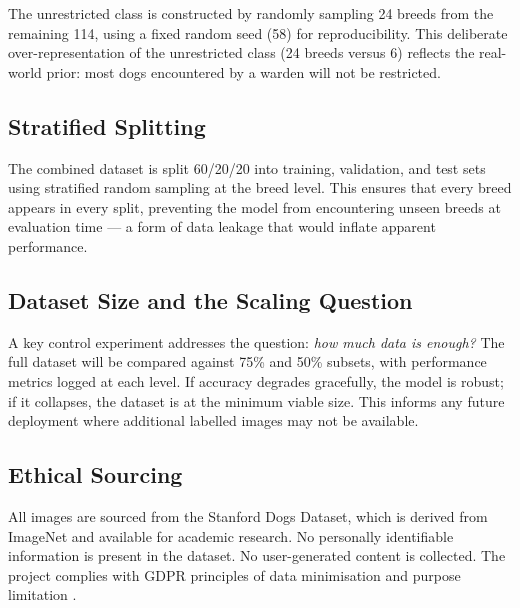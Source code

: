 The unrestricted class is constructed by randomly sampling 24 breeds from the remaining 114, using a fixed random seed (58) for reproducibility. This deliberate over-representation of the unrestricted class (24 breeds versus 6) reflects the real-world prior: most dogs encountered by a warden will not be restricted.

\subsection{Stratified Splitting}

The combined dataset is split 60/20/20 into training, validation, and test sets using stratified random sampling at the breed level. This ensures that every breed appears in every split, preventing the model from encountering unseen breeds at evaluation time --- a form of data leakage that would inflate apparent performance.

\subsection{Dataset Size and the Scaling Question}

A key control experiment addresses the question: \textit{how much data is enough?} The full dataset will be compared against 75\% and 50\% subsets, with performance metrics logged at each level. If accuracy degrades gracefully, the model is robust; if it collapses, the dataset is at the minimum viable size. This informs any future deployment where additional labelled images may not be available.

\subsection{Ethical Sourcing}

All images are sourced from the Stanford Dogs Dataset, which is derived from ImageNet and available for academic research. No personally identifiable information is present in the dataset. No user-generated content is collected. The project complies with GDPR principles of data minimisation and purpose limitation \citep{voigt2017gdpr}.
